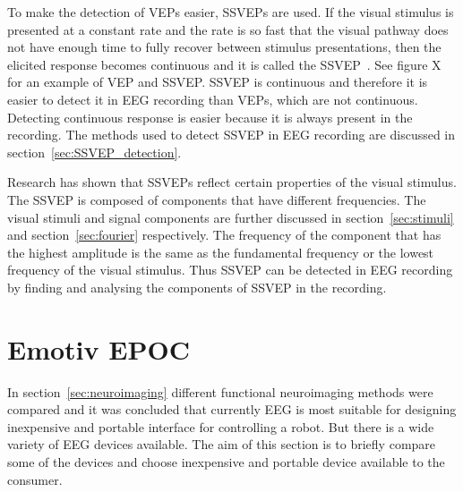 To make the detection of \glspl{VEP} easier, \glspl{SSVEP} are used. If the visual stimulus is presented at a constant rate and the rate is so fast that the visual pathway does not have enough time to fully recover between stimulus presentations, then the elicited response becomes continuous and it is called the \gls{SSVEP}~\cite{VEP}. See figure X for an example of \gls{VEP} and \gls{SSVEP}. \gls{SSVEP} is continuous and therefore it is easier to detect it in \gls{EEG} recording than \glspl{VEP}, which are not continuous. Detecting continuous response is easier because it is always present in the recording. The methods used to detect \gls{SSVEP} in \gls{EEG} recording are discussed in section~\ref{sec:SSVEP_detection}.

Research has shown that \glspl{SSVEP} reflect certain properties of the visual stimulus. The \gls{SSVEP} is composed of components that have different frequencies. The visual stimuli and signal components are further discussed in section~\ref{sec:stimuli} and section~\ref{sec:fourier} respectively. The frequency of the component that has the highest amplitude is the same as the \gls{fundamental frequency} or the lowest frequency of the visual stimulus. Thus \gls{SSVEP} can be detected in \gls{EEG} recording by finding and analysing the components of \gls{SSVEP} in the recording.

\section{Emotiv EPOC}
\label{sec:EEG_comparison}

In section~\ref{sec:neuroimaging} different functional neuroimaging methods were compared and it was concluded that currently \gls{EEG} is most suitable for designing inexpensive and portable interface for controlling a robot. But there is a wide variety of EEG devices available. The aim of this section is to briefly compare some of the devices and choose inexpensive and portable device available to the consumer.

